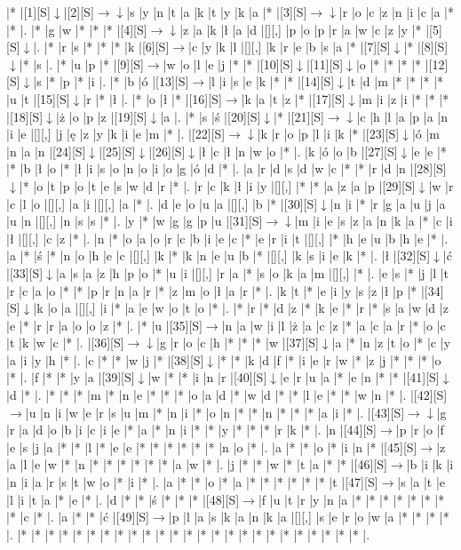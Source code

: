 \documentclass[11pt]{article}
\newcommand\drarr{$\rightarrow \!\!\!\!\! \downarrow$}
\newcommand\rarr{$\rightarrow$}
\newcommand\darr{$\downarrow$}
\begin{document}
\noindent\begin{Puzzle}{24}{32}|*	|[1][S]\darr	|[2][S]\drarr	|s	|y	|n	|t	|a	|k	|t	|y	|k	|a	|*	|[3][S]\drarr	|r	|o	|c	|z	|n	|i	|c	|a	|*	|*	|.
|*	|g	|w	|*	|*	|*	|[4][S]\drarr	|z	|a	|k	|ł	|a	|d	|[][,]{ }	|p	|o	|p	|r	|a	|w	|c	|z	|y	|*	|[5][S]\darr	|.
|*	|r	|s	|*	|*	|*	|k	|[6][S]\rarr	|c	|y	|k	|l	|[][,]{ }	|k	|r	|e	|b	|s	|a	|*	|[7][S]\darr	|*	|[8][S]\darr	|*	|s	|.
|*	|u	|p	|*	|[9][S]\rarr	|w	|o	|l	|e	|j	|*	|*	|[10][S]\darr	|[11][S]\darr	|o	|*	|*	|*	|*	|[12][S]\darr	|s	|*	|p	|*	|i	|.
|*	|b	|ó	|[13][S]\rarr	|l	|i	|s	|e	|k	|*	|*	|[14][S]\darr	|t	|d	|m	|*	|*	|*	|*	|u	|t	|[15][S]\darr	|r	|*	|ł	|.
|*	|o	|ł	|*	|[16][S]\rarr	|k	|a	|t	|z	|*	|[17][S]\darr	|m	|i	|z	|i	|*	|*	|*	|[18][S]\darr	|ż	|o	|p	|z	|[19][S]\darr	|a	|.
|*	|s	|ś	|[20][S]\darr	|*	|[21][S]\drarr	|c	|h	|l	|a	|p	|a	|n	|i	|e	|[][,]{ }	|j	|ę	|z	|y	|k	|i	|e	|m	|*	|.
|[22][S]\drarr	|k	|r	|o	|p	|l	|i	|k	|*	|[23][S]\darr	|ó	|m	|n	|a	|n	|[24][S]\darr	|[25][S]\darr	|[26][S]\darr	|ł	|c	|ł	|n	|w	|o	|*	|.
|k	|ó	|o	|b	|[27][S]\darr	|e	|e	|*	|*	|b	|ł	|o	|*	|ł	|i	|s	|o	|n	|o	|i	|o	|g	|ó	|d	|*	|.
|a	|r	|d	|s	|d	|w	|c	|*	|*	|r	|d	|n	|[28][S]\darr	|*	|o	|t	|p	|o	|t	|e	|s	|w	|d	|r	|*	|.
|r	|c	|k	|ł	|i	|y	|[][,]{ }	|*	|*	|a	|z	|a	|p	|[29][S]\darr	|w	|r	|c	|l	|o	|[][,]{ }	|a	|i	|[][,]{ }	|a	|*	|.
|d	|e	|o	|u	|a	|[][,]{ }	|b	|*	|[30][S]\darr	|n	|i	|*	|r	|g	|a	|u	|j	|a	|u	|n	|[][,]{ }	|n	|s	|s	|*	|.
|y	|*	|w	|g	|g	|p	|u	|[31][S]\drarr	|m	|i	|e	|s	|z	|a	|n	|k	|a	|*	|c	|i	|ł	|[][,]{ }	|c	|z	|*	|.
|n	|*	|o	|a	|o	|r	|c	|b	|i	|e	|c	|*	|e	|r	|i	|t	|[][,]{ }	|*	|h	|e	|u	|b	|h	|e	|*	|.
|a	|*	|ś	|*	|n	|o	|h	|e	|c	|[][,]{ }	|k	|*	|k	|n	|e	|u	|b	|*	|[][,]{ }	|k	|s	|i	|e	|k	|*	|.
|ł	|[32][S]\darr	|ć	|[33][S]\darr	|a	|s	|a	|z	|h	|p	|o	|*	|u	|i	|[][,]{ }	|r	|a	|*	|s	|o	|k	|a	|m	|[][,]{ }	|*	|.
|e	|s	|*	|j	|l	|t	|r	|c	|a	|o	|*	|*	|p	|r	|n	|a	|r	|*	|z	|m	|o	|ł	|a	|r	|*	|.
|k	|t	|*	|e	|i	|y	|s	|z	|ł	|p	|*	|[34][S]\darr	|k	|o	|a	|[][,]{ }	|i	|*	|a	|e	|w	|o	|t	|o	|*	|.
|*	|r	|*	|d	|z	|*	|k	|e	|*	|r	|*	|s	|a	|w	|d	|z	|e	|*	|r	|r	|a	|o	|o	|z	|*	|.
|*	|u	|[35][S]\rarr	|n	|a	|w	|i	|l	|ż	|a	|c	|z	|*	|a	|c	|a	|r	|*	|o	|c	|t	|k	|w	|c	|*	|.
|[36][S]\drarr	|g	|r	|o	|c	|h	|*	|*	|*	|w	|[37][S]\darr	|a	|*	|n	|z	|t	|o	|*	|c	|y	|a	|i	|y	|h	|*	|.
|c	|*	|*	|w	|j	|*	|[38][S]\darr	|*	|*	|k	|d	|f	|*	|i	|e	|r	|w	|*	|z	|j	|*	|*	|*	|o	|*	|.
|f	|*	|*	|y	|a	|[39][S]\darr	|w	|*	|*	|i	|n	|r	|[40][S]\darr	|e	|r	|u	|a	|*	|e	|n	|*	|*	|[41][S]\darr	|d	|*	|.
|*	|*	|*	|m	|*	|n	|e	|*	|*	|*	|o	|a	|d	|*	|w	|d	|*	|*	|l	|e	|*	|*	|w	|n	|*	|.
|[42][S]\rarr	|u	|n	|i	|w	|e	|r	|s	|u	|m	|*	|n	|i	|*	|o	|n	|*	|*	|n	|*	|*	|*	|a	|i	|*	|.
|[43][S]\drarr	|g	|r	|a	|d	|o	|b	|i	|c	|i	|e	|*	|a	|*	|n	|i	|*	|*	|y	|*	|*	|*	|r	|k	|*	|.
|n	|[44][S]\rarr	|p	|r	|o	|f	|e	|s	|j	|a	|*	|*	|l	|*	|e	|e	|*	|*	|*	|*	|*	|*	|n	|o	|*	|.
|a	|*	|*	|o	|*	|i	|n	|*	|[45][S]\rarr	|z	|a	|l	|e	|w	|*	|n	|*	|*	|*	|*	|*	|*	|a	|w	|*	|.
|j	|*	|*	|w	|*	|t	|a	|*	|*	|[46][S]\rarr	|b	|i	|k	|i	|n	|i	|a	|r	|s	|t	|w	|o	|*	|i	|*	|.
|a	|*	|*	|o	|*	|a	|*	|*	|*	|*	|*	|*	|t	|[47][S]\rarr	|s	|a	|t	|e	|l	|i	|t	|a	|*	|e	|*	|.
|d	|*	|*	|ś	|*	|*	|*	|[48][S]\rarr	|f	|u	|t	|r	|y	|n	|a	|*	|*	|*	|*	|*	|*	|*	|*	|c	|*	|.
|a	|*	|*	|ć	|[49][S]\rarr	|p	|l	|a	|s	|k	|a	|n	|k	|a	|[][,]{ }	|s	|e	|r	|o	|w	|a	|*	|*	|*	|*	|.
|*	|*	|*	|*	|*	|*	|*	|*	|*	|*	|*	|*	|*	|*	|*	|*	|*	|*	|*	|*	|*	|*	|*	|*	|*	|.\end{Puzzle}
\end{document}
